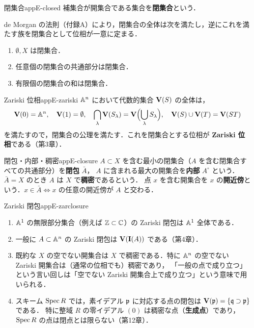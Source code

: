 \begin{mydef}{閉集合}{appE-closed}
補集合が開集合である集合を\textbf{閉集合}という．
\end{mydef}

de Morgan の法則（付録A）により，閉集合の全体は次を満たし，逆にこれを満たす族を閉集合として位相が一意に定まる．
\begin{enumerate}
\item $\emptyset,X$ は閉集合．
\item 任意個の閉集合の共通部分は閉集合．
\item 有限個の閉集合の和は閉集合．
\end{enumerate}

\begin{myex}{Zariski 位相}{appE-zariski}
$\mathbb{A}^n$ において代数的集合 $\mathbf{V}(S)$ の全体は，
\[
\mathbf{V}(0)=\mathbb{A}^n,\quad\mathbf{V}(1)=\emptyset,\quad
\bigcap_\lambda\mathbf{V}(S_\lambda)=\mathbf{V}\Bigl(\bigcup_\lambda S_\lambda\Bigr),\quad
\mathbf{V}(S)\cup\mathbf{V}(T)=\mathbf{V}(ST)
\]
を満たすので，閉集合の公理を満たす．これを閉集合とする位相が \textbf{Zariski 位相}である（第3章）．
\end{myex}

\begin{mydef}{閉包・内部・稠密}{appE-closure}
$A\subset X$ を含む最小の閉集合（$A$ を含む閉集合すべての共通部分）を\textbf{閉包} $\bar A$，
$A$ に含まれる最大の開集合を\textbf{内部} $A^\circ$ という．
$\bar A=X$ のとき $A$ は $X$ で\textbf{稠密}であるという．
点 $x$ を含む開集合を $x$ の\textbf{開近傍}という．$x\in\bar A\iff x$ の任意の開近傍が $A$ と交わる．
\end{mydef}

\begin{myex}{Zariski 閉包}{appE-zarclosure}
\begin{enumerate}
\item $\mathbb{A}^1$ の無限部分集合（例えば $\mathbb{Z}\subset\mathbb{C}$）の Zariski 閉包は $\mathbb{A}^1$ 全体である．
\item 一般に $A\subset\mathbb{A}^n$ の Zariski 閉包は $\mathbf{V}(\mathbf{I}(A))$ である（第4章）．
\item 既約な $X$ の空でない開集合は $X$ で稠密である．特に $\mathbb{A}^n$ の空でない Zariski 開集合は（通常の位相でも）稠密であり，
「一般の点で成り立つ」という言い回しは「空でない Zariski 開集合上で成り立つ」という意味で用いられる．
\item スキーム $\operatorname{Spec} R$ では，素イデアル $\mathfrak{p}$ に対応する点の閉包は $\mathbf{V}(\mathfrak{p})=\{\mathfrak{q}\supset\mathfrak{p}\}$ である．
特に整域 $R$ の零イデアル $(0)$ は稠密な点（\textbf{生成点}）であり，$\operatorname{Spec} R$ の点は閉点とは限らない（第12章）．
\end{enumerate}
\end{myex}

